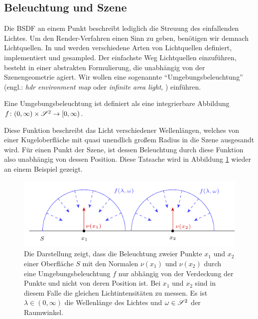 
	\subsection{Beleuchtung und Szene} %
	\label{sub:beleuchtung_und_szene}

		Die BSDF an einem Punkt beschreibt lediglich die Streuung des einfallenden Lichtes.
		Um den Render-Verfahren einen Sinn zu geben, benötigen wir demnach Lichtquellen.
		In \cite[S.~707~ff]{pbrt3} und \cite{course-photon-map} werden verschiedene Arten von Lichtquellen definiert, implementiert und gesampled.
		Der einfachste Weg Lichtquellen einzuführen, besteht in einer abstrakten Formulierung, die unabhängig von der Szenengeometrie agiert.
		Wir wollen eine sogenannte \enquote{Umgebungsbeleuchtung} (engl.: \textit{hdr environment map} oder \textit{infinite area light}, \cite[S.~737~f]{pbrt3}) einführen.
		\begin{definition}[Umgebungsbeleuchtung]
			Eine Umgebungsbeleuchtung ist definiert als eine integrierbare Abbildung $f\colon(0,\infty)\times\mathscr{S}^{2}\to[0,\infty)$.
		\end{definition}

		Diese Funktion beschreibt das Licht verschiedener Wellenlängen, welches von einer Kugeloberfläche mit quasi unendlich großem Radius in die Szene ausgesandt wird.
		Für einen Punkt der Szene, ist dessen Beleuchtung durch diese Funktion also unabhängig von dessen Position.
		Diese Tatsache wird in Abbildung \ref{fig:hdr_environment_map} wieder an einem Beispiel gezeigt.

		\begin{figure}[h]
			\center
			\includegraphics{gg_fig/hdr_environment_map_1.pdf}
			\caption[Wirkungsweise einer Umgebungsbeleuchtung]{Die Darstellung zeigt, dass die Beleuchtung zweier Punkte $x_1$ und $x_2$ einer Oberfläche $S$ mit den Normalen $\nu(x_1)$ und $\nu(x_2)$ durch eine Umgebungsbeleuchtung $f$ nur abhängig von der Verdeckung der Punkte und nicht von deren Position ist. Bei $x_1$ und $x_2$ sind in diesem Falle die gleichen Lichtintensitäten zu messen. Es ist $\lambda\in(0,\infty)$ die Wellenlänge des Lichtes und $\omega\in\mathscr{S}^{2}$ der Raumwinkel.}
			\label{fig:hdr_environment_map}
		\end{figure}

